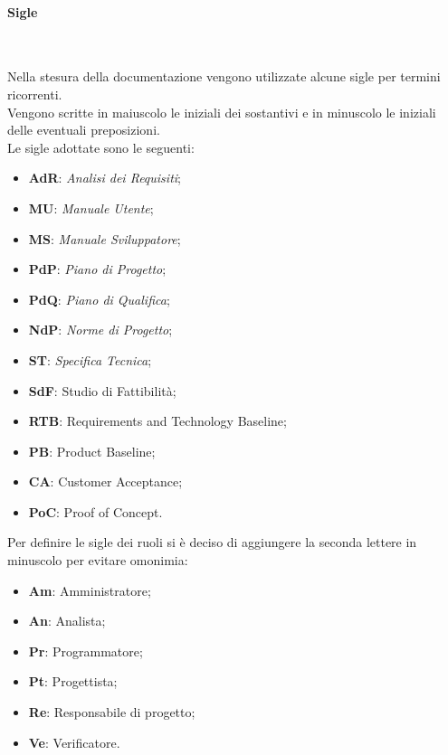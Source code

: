 \paragraph{Sigle} ~

Nella stesura della documentazione vengono utilizzate alcune sigle per termini ricorrenti. \\
Vengono scritte in maiuscolo le iniziali dei sostantivi e in minuscolo le iniziali delle eventuali preposizioni. \\
Le sigle adottate sono le seguenti:
\begin{itemize}
    \item \textbf{AdR}: \textit{Analisi dei Requisiti};
    \item \textbf{MU}: \textit{Manuale Utente};
    \item \textbf{MS}: \textit{Manuale Sviluppatore};
    \item \textbf{PdP}: \textit{Piano di Progetto};
    \item \textbf{PdQ}: \textit{Piano di Qualifica};
    \item \textbf{NdP}: \textit{Norme di Progetto};
    \item \textbf{ST}: \textit{Specifica Tecnica};
    \item \textbf{SdF}: Studio di Fattibilità;
    \item \textbf{RTB}: Requirements and Technology Baseline;
    \item \textbf{PB}: Product Baseline;
    \item \textbf{CA}: Customer Acceptance;
    \item \textbf{PoC}: Proof of Concept.
\end{itemize}

Per definire le sigle dei ruoli si è deciso di aggiungere la seconda lettere in minuscolo per evitare omonimia:
\begin{itemize}
    \item \textbf{Am}: Amministratore;
    \item \textbf{An}: Analista;
    \item \textbf{Pr}: Programmatore;
    \item \textbf{Pt}: Progettista;
    \item \textbf{Re}: Responsabile di progetto;
    \item \textbf{Ve}: Verificatore.
\end{itemize}

